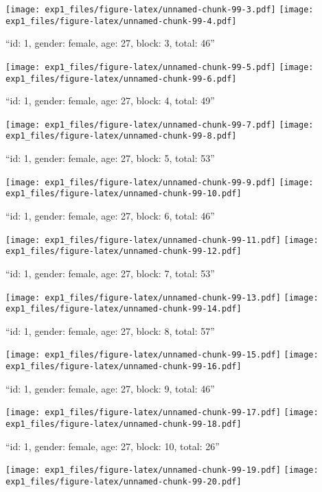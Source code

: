 \documentclass[,]{article}
\begin{document}
\texttt{[image: exp1\_files/figure-latex/unnamed-chunk-99-3.pdf]}
\texttt{[image: exp1\_files/figure-latex/unnamed-chunk-99-4.pdf]}

\newpage
[1] 

``id: 1, gender: female, age: 27, block: 3, total: 46''

\texttt{[image: exp1\_files/figure-latex/unnamed-chunk-99-5.pdf]}
\texttt{[image: exp1\_files/figure-latex/unnamed-chunk-99-6.pdf]}

\newpage
[1] 

``id: 1, gender: female, age: 27, block: 4, total: 49''

\texttt{[image: exp1\_files/figure-latex/unnamed-chunk-99-7.pdf]}
\texttt{[image: exp1\_files/figure-latex/unnamed-chunk-99-8.pdf]}

\newpage
[1] 

``id: 1, gender: female, age: 27, block: 5, total: 53''

\texttt{[image: exp1\_files/figure-latex/unnamed-chunk-99-9.pdf]}
\texttt{[image: exp1\_files/figure-latex/unnamed-chunk-99-10.pdf]}

\newpage
[1] 

``id: 1, gender: female, age: 27, block: 6, total: 46''

\texttt{[image: exp1\_files/figure-latex/unnamed-chunk-99-11.pdf]}
\texttt{[image: exp1\_files/figure-latex/unnamed-chunk-99-12.pdf]}

\newpage
[1] 

``id: 1, gender: female, age: 27, block: 7, total: 53''

\texttt{[image: exp1\_files/figure-latex/unnamed-chunk-99-13.pdf]}
\texttt{[image: exp1\_files/figure-latex/unnamed-chunk-99-14.pdf]}

\newpage
[1] 

``id: 1, gender: female, age: 27, block: 8, total: 57''

\texttt{[image: exp1\_files/figure-latex/unnamed-chunk-99-15.pdf]}
\texttt{[image: exp1\_files/figure-latex/unnamed-chunk-99-16.pdf]}

\newpage
[1] 

``id: 1, gender: female, age: 27, block: 9, total: 46''

\texttt{[image: exp1\_files/figure-latex/unnamed-chunk-99-17.pdf]}
\texttt{[image: exp1\_files/figure-latex/unnamed-chunk-99-18.pdf]}

\newpage
[1] 

``id: 1, gender: female, age: 27, block: 10, total: 26''

\texttt{[image: exp1\_files/figure-latex/unnamed-chunk-99-19.pdf]}
\texttt{[image: exp1\_files/figure-latex/unnamed-chunk-99-20.pdf]}
\end{document}

